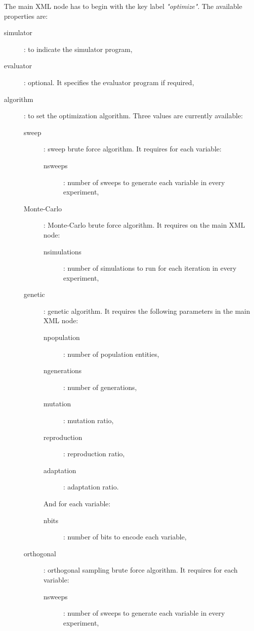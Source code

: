 \documentclass[a4paper]{report}
\begin{document}
The main XML node has to begin with the key label \emph{"optimize"}. The
available properties are:
\begin{description}
	\item[simulator]: to indicate the simulator program,
	\item[evaluator]: optional. It specifies the evaluator program if required,
	\item[algorithm]: to set the optimization algorithm. Three values are
		currently available:
	\begin{description}
		\item[sweep]: sweep brute force algorithm. It requires for each
			variable:
		\begin{description}
			\item[nsweeps]: number of sweeps to generate each variable in every
			experiment,
		\end{description}
		\item[Monte-Carlo]: Monte-Carlo brute force algorithm. It requires on 
			the main XML node:
			\begin{description}
				\item[nsimulations]: number of simulations to run for each 
					iteration in every experiment,
			\end{description}
		\item[genetic]: genetic algorithm. It requires the following parameters 
			in the main XML node:
			\begin{description}
				\item[npopulation]: number of population entities,
				\item[ngenerations]: number of generations,
				\item[mutation]: mutation ratio,
				\item[reproduction]: reproduction ratio,
				\item[adaptation]: adaptation ratio.
			\end{description}
			And for each variable:
			\begin{description}
				\item[nbits]: number of bits to encode each variable,
			\end{description}
		\item[orthogonal]: orthogonal sampling brute force algorithm. It 
			requires for each variable:
		\begin{description}
			\item[nsweeps]: number of sweeps to generate each variable in every
			experiment,
		\end{description}

\end{description}
\end{description}
\end{document}
